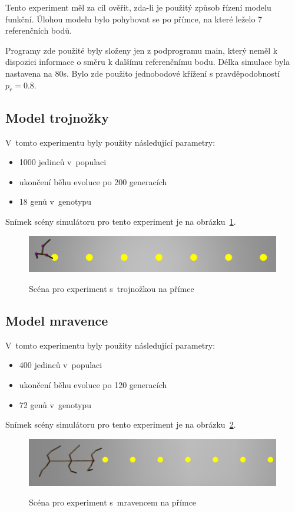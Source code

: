Tento experiment měl za cíl ověřit, zda-li je použitý způsob řízení modelu funkční.
Úlohou modelu bylo pohybovat se po přímce, na které leželo 7 referenčních bodů.

Programy zde použité byly složeny jen z podprogramu main, který neměl k dispozici informace o směru k dalšímu referenčnímu bodu.
Délka simulace byla nastavena na 80s.
Bylo zde použito jednobodové křížení s pravděpodobností $p_r = 0.8$.

\subsection{Model trojnožky}
V~tomto experimentu byly použity následující parametry:
\begin{itemize}
    \item 1000 jedinců v~populaci
    \item ukončení běhu evoluce po 200 generacích
    \item 18 genů v~genotypu
\end{itemize}

Snímek scény simulátoru pro tento experiment je na obrázku~\ref{fig:trojnozka_primka_zhora}.
\begin{figure}[h]
    \centering
    {\includegraphics[width=30em]{obrazky/trojnozka_primka_zhora.png}}
    \caption{
    Scéna pro experiment s~trojnožkou na přímce
    }
    \label{fig:trojnozka_primka_zhora}
\end{figure}



\subsection{Model mravence}
V~tomto experimentu byly použity následující parametry:
\begin{itemize}
    \item 400 jedinců v~populaci
    \item ukončení běhu evoluce po 120 generacích
    \item 72 genů v~genotypu
\end{itemize}

Snímek scény simulátoru pro tento experiment je na obrázku~\ref{fig:mravenec_primka_zhora}.
\begin{figure}[h]
    \centering
    {\includegraphics[width=30em]{obrazky/mravenec_primka_zhora.png}}
    \caption{
    Scéna pro experiment s~mravencem na přímce
    }
    \label{fig:mravenec_primka_zhora}
\end{figure}



